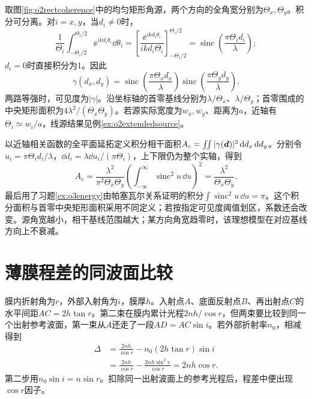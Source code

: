 取图\ref{fig:o2rectcoherence}中的均匀矩形角源，两个方向的全角宽分别为$\Theta_x,\Theta_y$。积分可分离。对$i=x,y$，当$d_i\ne0$时，
\[
 \frac1{\Theta_i}\int_{-\Theta_i/2}^{\Theta_i/2}
 \ee^{ikd_i\theta_i}\dd\theta_i
 =\left[\frac{\ee^{ikd_i\theta_i}}{ikd_i\Theta_i}\right]_{-\Theta_i/2}^{\Theta_i/2}
 =\operatorname{sinc}\left(\frac{\pi\Theta_i d_i}{\lambda}\right);
\]
$d_i=0$时直接积分为1。因此
\[
 \gamma(d_x,d_y)=
 \operatorname{sinc}\left(\frac{\pi\Theta_xd_x}{\lambda}\right)
 \operatorname{sinc}\left(\frac{\pi\Theta_yd_y}{\lambda}\right).
\]
两路等强时，可见度为$|\gamma|$。沿坐标轴的首零基线分别为$\lambda/\Theta_x$、$\lambda/\Theta_y$；首零围成的中央矩形面积为$4\lambda^2/(\Theta_x\Theta_y)$。若源实际宽度为$w_x,w_y$、距离为$a$，近轴有$\Theta_i\simeq w_i/a$，线源结果见例\ref{ex:o2extendedsource}。

以近轴相关函数的全平面延拓定义积分相干面积$A_c=\iint|\gamma(\bm{d})|^2\mathop{}\!\mathrm d d_x\mathop{}\!\mathrm d d_y$。分别令$u_i=\pi\Theta_id_i/\lambda$，$\dd d_i=\lambda\dd u_i/(\pi\Theta_i)$，上下限仍为整个实轴，得到
\[
 A_c=\frac{\lambda^2}{\pi^2\Theta_x\Theta_y}
 \left(\int_{-\infty}^{\infty}\operatorname{sinc}^2u\,\dd u\right)^2
 =\frac{\lambda^2}{\Theta_x\Theta_y}.
\]
最后用了习题\ref{ex:o3energy}由帕塞瓦尔关系证明的积分$\int\operatorname{sinc}^2u\,\dd u=\pi$。这个积分面积与首零中央矩形面积采用不同定义；若按指定可见度阈值划区，系数还会改变。源角宽越小，相干基线范围越大；某方向角宽趋零时，该理想模型在对应基线方向上不衰减。

\section{薄膜程差的同波面比较}
膜内折射角为$r$，外部入射角为$i$，膜厚$h$。入射点$A$、底面反射点$B$、再出射点$C$的水平间距$AC=2h\tan r$。第二束在膜内累计光程$2nh/\cos r$，但两束要比较到同一个出射参考波面，第一束从$A$还走了一段$AD=AC\sin i$。若外部折射率$n_0$，相减得到
\begin{align*}
 \Delta&=\frac{2nh}{\cos r}-n_0(2h\tan r)\sin i\\
 &=\frac{2nh}{\cos r}-\frac{2nh\sin^2r}{\cos r}
 =2nh\cos r.
\end{align*}
第二步用$n_0\sin i=n\sin r$。扣除同一出射波面上的参考光程后，程差中便出现$\cos r$因子。

